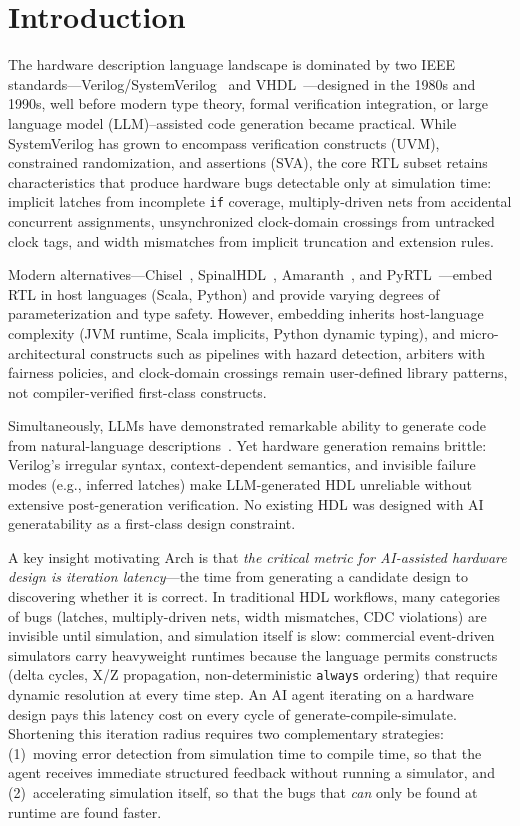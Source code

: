 \documentclass[11pt,twocolumn]{article}
\begin{document}
\section{Introduction}\label{sec:intro}

The hardware description language landscape is dominated by two IEEE standards---Verilog/SystemVerilog~\cite{ieee1800} and VHDL~\cite{ieee1076}---designed in the 1980s and 1990s, well before modern type theory, formal verification integration, or large language model (LLM)--assisted code generation became practical.
While SystemVerilog has grown to encompass verification constructs (UVM), constrained randomization, and assertions (SVA), the core RTL subset retains characteristics that produce hardware bugs detectable only at simulation time:
implicit latches from incomplete \texttt{if} coverage, multiply-driven nets from accidental concurrent assignments, unsynchronized clock-domain crossings from untracked clock tags, and width mismatches from implicit truncation and extension rules.

Modern alternatives---Chisel~\cite{chisel}, SpinalHDL~\cite{spinalhdl}, Amaranth~\cite{amaranth}, and PyRTL~\cite{pyrtl}---embed RTL in host languages (Scala, Python) and provide varying degrees of parameterization and type safety.
However, embedding inherits host-language complexity (JVM runtime, Scala implicits, Python dynamic typing), and micro-architectural constructs such as pipelines with hazard detection, arbiters with fairness policies, and clock-domain crossings remain user-defined library patterns, not compiler-verified first-class constructs.

Simultaneously, LLMs have demonstrated remarkable ability to generate code from natural-language descriptions~\cite{codex,copilot}.
Yet hardware generation remains brittle: Verilog's irregular syntax, context-dependent semantics, and invisible failure modes (e.g., inferred latches) make LLM-generated HDL unreliable without extensive post-generation verification.
No existing HDL was designed with AI generatability as a first-class design constraint.

A key insight motivating Arch is that \emph{the critical metric for AI-assisted hardware design is iteration latency}---the time from generating a candidate design to discovering whether it is correct. In traditional HDL workflows, many categories of bugs (latches, multiply-driven nets, width mismatches, CDC violations) are invisible until simulation, and simulation itself is slow: commercial event-driven simulators carry heavyweight runtimes because the language permits constructs (delta cycles, X/Z propagation, non-deterministic \texttt{always} ordering) that require dynamic resolution at every time step. An AI agent iterating on a hardware design pays this latency cost on every cycle of generate-compile-simulate. Shortening this iteration radius requires two complementary strategies: (1)~moving error detection from simulation time to compile time, so that the agent receives immediate structured feedback without running a simulator, and (2)~accelerating simulation itself, so that the bugs that \emph{can} only be found at runtime are found faster.
\end{document}
